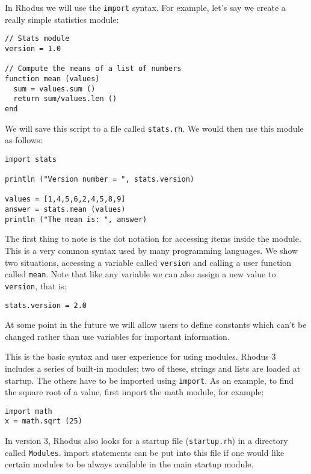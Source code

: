 In Rhodus we will use the {\tt import} syntax. For example, let's say we create a really simple statistics module:

\begin{lstlisting}
// Stats module
version = 1.0

// Compute the means of a list of numbers
function mean (values)
  sum = values.sum ()
  return sum/values.len ()
end
\end{lstlisting}

We will save this script to a file called {\tt stats.rh}. We would then use this module as follows:

\begin{lstlisting}
import stats

println ("Version number = ", stats.version)

values = [1,4,5,6,2,4,5,8,9]
answer = stats.mean (values)
println ("The mean is: ", answer)
\end{lstlisting}

The first thing to note is the dot notation for accessing items inside the module. This is a very common syntax used by many programming languages. We show two situations, accessing a variable called {\tt version} and calling a user function called {\tt mean}. Note that like any variable we can also assign a new value to {\tt version}, that is:

\begin{lstlisting}
stats.version = 2.0
\end{lstlisting}

At some point in the future we will allow users to define constants which can't be changed rather than use variables for important information.

This is the basic syntax and user experience for using modules. Rhodus 3 includes a series of built-in modules; two of these, strings and lists are loaded at startup. The others have to be imported using {\tt import}. As an example, to find the square root of a value, first import the math module, for example:

\begin{lstlisting}
import math
x = math.sqrt (25)
\end{lstlisting}

In version 3, Rhodus also looks for a startup file ({\tt startup.rh}) in a directory called {\tt Modules}. import statements can be put into this file if one would like certain modules to be always available in the main startup module.

